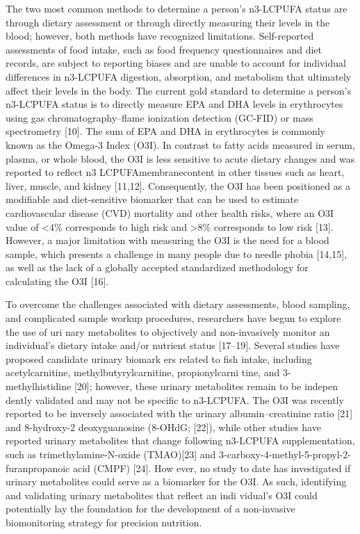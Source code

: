 \documentclass[journal=jacsat,manuscript=article]{achemso}
\begin{document}
The two most common methods to determine a person's n3-LCPUFA status are
through dietary assessment or through directly measuring their levels in
the blood; however, both methods have recognized limitations.
Self-reported assessments of food intake, such as food frequency
questionnaires and diet records, are subject to reporting biases and are
unable to account for individual differences in n3-LCPUFA digestion,
absorption, and metabolism that ultimately affect their levels in the
body. The current gold standard to determine a person's n3-LCPUFA status
is to directly measure EPA and DHA levels in erythrocytes using gas
chromatography--flame ionization detection (GC-FID) or mass spectrometry
{[}10{]}. The sum of EPA and DHA in erythrocytes is commonly known as
the Omega-3 Index (O3I). In contrast to fatty acids measured in serum,
plasma, or whole blood, the O3I is less sensitive to acute dietary
changes and was reported to reflect n3 LCPUFAmembranecontent in other
tissues such as heart, liver, muscle, and kidney {[}11,12{]}.
Consequently, the O3I has been positioned as a modifiable and
diet-sensitive biomarker that can be used to estimate cardiovascular
disease (CVD) mortality and other health risks, where an O3I value of
\textless4\% corresponds to high risk and \textgreater8\% corresponds to
low risk {[}13{]}. However, a major limitation with measuring the O3I is
the need for a blood sample, which presents a challenge in many people
due to needle phobia {[}14,15{]}, as well as the lack of a globally
accepted standardized methodology for calculating the O3I {[}16{]}.

To overcome the challenges associated with dietary assessments, blood
sampling, and complicated sample workup procedures, researchers have
begun to explore the use of uri nary metabolites to objectively and
non-invasively monitor an individual's dietary intake and/or nutrient
status {[}17--19{]}. Several studies have proposed candidate urinary
biomark ers related to fish intake, including acetylcarnitine,
methylbutyrylcarnitine, propionylcarni tine, and 3-methylhistidine
{[}20{]}; however, these urinary metabolites remain to be indepen dently
validated and may not be specific to n3-LCPUFA. The O3I was recently
reported to be inversely associated with the urinary albumin--creatinine
ratio {[}21{]} and 8-hydroxy-2 deoxyguanosine (8-OHdG; {[}22{]}), while
other studies have reported urinary metabolites that change following
n3-LCPUFA supplementation, such as trimethylamine-N-oxide (TMAO){[}23{]}
and 3-carboxy-4-methyl-5-propyl-2-furanpropanoic acid (CMPF) {[}24{]}.
How ever, no study to date has investigated if urinary metabolites could
serve as a biomarker for the O3I. As such, identifying and validating
urinary metabolites that reflect an indi vidual's O3I could potentially
lay the foundation for the development of a non-invasive biomonitoring
strategy for precision nutrition.
\end{document}
